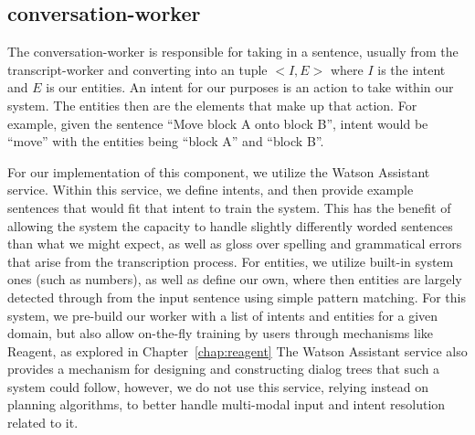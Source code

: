 \subsection{conversation-worker}

The conversation-worker is responsible for taking in a sentence, usually from the
transcript-worker and converting into an tuple $<I, E>$ where $I$ is the intent and
$E$ is our entities. An intent for our purposes is an action to take within our system.
The entities then are the elements that make up that action. For example, given the
sentence ``Move block A onto block B'', intent would be ``move'' with the entities being
``block A'' and ``block B''.

For our implementation of this component, we utilize the Watson Assistant service. Within this
service, we define intents, and then provide example sentences that would fit that intent
to train the system. This has the benefit of allowing the system the capacity to handle slightly
differently worded sentences than what we might expect, as well as gloss over spelling and
grammatical errors that arise from the transcription process. For entities, we utilize built-in
system ones (such as numbers), as well as define our own, where then entities are largely detected
through from the input sentence using simple pattern matching. For this system, we
pre-build our worker with a list of intents and entities for a given domain, but also
allow on-the-fly training by users through mechanisms like Reagent, as explored in
Chapter~\ref{chap:reagent} The Watson Assistant service also provides a mechanism
for designing and constructing dialog trees that such a system could follow, however, we
do not use this service, relying instead on planning algorithms, to better handle multi-modal
input and intent resolution related to it.
